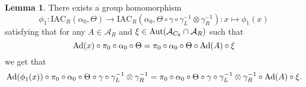 \documentclass[12pt,a4paper,twoside]{article}
\let\originalleft\left
\let\originalright\right
\renewcommand{\left}{\mathopen{}\mathclose\bgroup\originalleft}
\renewcommand{\right}{\aftergroup\egroup\originalright}
\renewcommand{\AA}{\mathcal A}
\newcommand{\Ad}[1]{\textrm{Ad}\left(#1\right)}
\newcommand{\Aut}[1]{\textrm{Aut}\left(#1\right)}
\theoremstyle{definition}
\newtheorem{lemma}[theorem]{Lemma}
\numberwithin{equation}{section}
\begin{document}
\begin{lemma}\label{lem:DefinitionOfGroupMorphism}
	There exists a group homomorphism
	\begin{equation}
		\phi_1:\textrm{IAC}_R(\alpha_0,\Theta) \rightarrow \textrm{IAC}_R(\alpha_0,\Theta\circ \gamma \circ \gamma_L^{-1}\otimes\gamma_R^{-1}):x\mapsto \phi_1(x)
	\end{equation}
	satisfying that for any $A\in\AA_R$ and $\xi\in\Aut{\AA_{C_\theta}\cap\AA_R}$ such that
	\begin{equation}
		\Ad{x}\circ\pi_0\circ\alpha_0\circ\Theta=\pi_0\circ\alpha_0\circ\Theta\circ\Ad{A}\circ\xi
	\end{equation}
	we get that
	\begin{equation}\label{eq:ConditionDefinitionOfGroupMorphism}
		\Ad{\phi_1(x)}\circ\pi_0\circ\alpha_0\circ\Theta\circ\gamma\circ\gamma_L^{-1}\otimes\gamma_R^{-1}=\pi_0\circ\alpha_0\circ\Theta\circ\gamma\circ\gamma_L^{-1}\otimes\gamma_R^{-1}\circ\Ad{A}\circ\xi.
	\end{equation}
\end{lemma}
\end{document}
